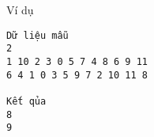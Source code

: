 Ví dụ
\begin{verbatim}
Dữ liệu mẫu
2
1 10 2 3 0 5 7 4 8 6 9 11
6 4 1 0 3 5 9 7 2 10 11 8

Kết qủa
8
9
\end{verbatim}